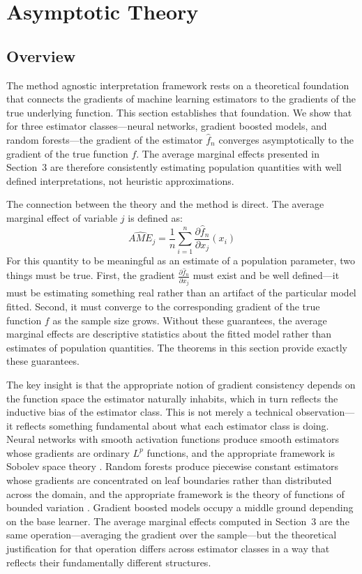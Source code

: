 \documentclass[12pt]{article}
\newcommand{\fn}{\hat{f}_n}
\begin{document}
	\section{Asymptotic Theory}
	\label{sec:theory}
	
	\subsection{Overview}
	
	The method agnostic interpretation framework rests on a theoretical foundation that
	connects the gradients of machine learning estimators to the gradients of the true
	underlying function. This section establishes that foundation. We show that for three
	estimator classes---neural networks, gradient boosted models, and random
	forests---the gradient of the estimator $\fn$ converges asymptotically to the gradient
	of the true function $f$. The average marginal effects presented in Section~3 are
	therefore consistently estimating population quantities with well defined
	interpretations, not heuristic approximations.
	
	The connection between the theory and the method is direct. The average marginal
	effect of variable $j$ is defined as:
	\begin{equation}
		\widehat{AME}_j = \frac{1}{n} \sum_{i=1}^n \frac{\partial \fn}{\partial x_j}(x_i)
		\label{eq:ame}
	\end{equation}
	For this quantity to be meaningful as an estimate of a population parameter, two
	things must be true. First, the gradient $\frac{\partial \fn}{\partial x_j}$ must
	exist and be well defined---it must be estimating something real rather than an
	artifact of the particular model fitted. Second, it must converge to the
	corresponding gradient of the true function $f$ as the sample size grows. Without
	these guarantees, the average marginal effects are descriptive statistics about the
	fitted model rather than estimates of population quantities. The theorems in this
	section provide exactly these guarantees.
	
	The key insight is that the appropriate notion of gradient consistency depends on the
	function space the estimator naturally inhabits, which in turn reflects the inductive
	bias of the estimator class. This is not merely a technical observation---it reflects
	something fundamental about what each estimator class is doing. Neural networks with
	smooth activation functions produce smooth estimators whose gradients are ordinary
	$L^p$ functions, and the appropriate framework is Sobolev space theory
	\citep{evans2010pde}. Random forests produce piecewise constant estimators whose
	gradients are concentrated on leaf boundaries rather than distributed across the
	domain, and the appropriate framework is the theory of functions of bounded variation
	\citep{ambrosio2000bv}. Gradient boosted models occupy a middle ground depending on
	the base learner. The average marginal effects computed in Section~3 are the same
	operation---averaging the gradient over the sample---but the theoretical justification
	for that operation differs across estimator classes in a way that reflects their
	fundamentally different structures.
	
\end{document}
